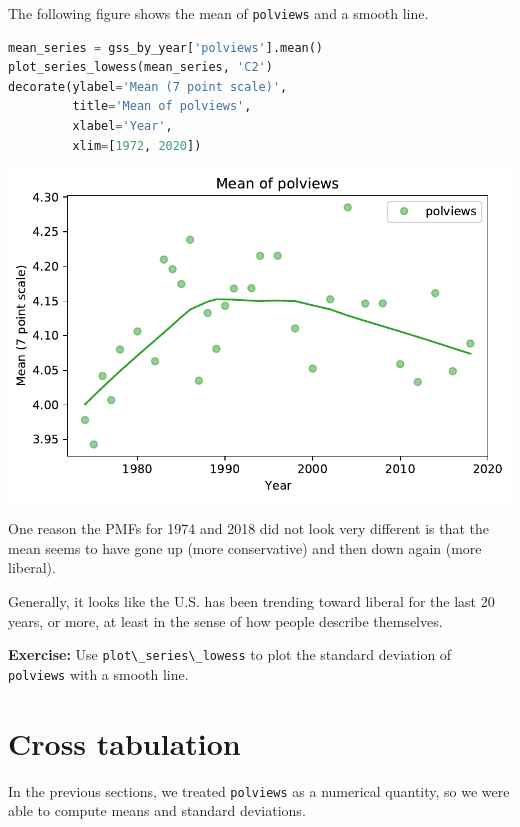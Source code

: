 The following figure shows the mean of
\passthrough{\lstinline!polviews!} and a smooth line.

\begin{lstlisting}[language=Python]
mean_series = gss_by_year['polviews'].mean()
plot_series_lowess(mean_series, 'C2')
decorate(ylabel='Mean (7 point scale)',
         title='Mean of polviews',
         xlabel='Year',
         xlim=[1972, 2020])
\end{lstlisting}

\begin{center}
\includegraphics[scale=0.75]{02_polviews_files/02_polviews_53_0.pdf}
\end{center}

One reason the PMFs for 1974 and 2018 did not look very different is
that the mean seems to have gone up (more conservative) and then down
again (more liberal).

Generally, it looks like the U.S. has been trending toward liberal for
the last 20 years, or more, at least in the sense of how people describe
themselves.

\textbf{Exercise:} Use \passthrough{\lstinline!plot\_series\_lowess!} to
plot the standard deviation of \passthrough{\lstinline!polviews!} with a
smooth line.

\hypertarget{cross-tabulation}{%
\section{Cross tabulation}\label{cross-tabulation}}

In the previous sections, we treated \passthrough{\lstinline!polviews!}
as a numerical quantity, so we were able to compute means and standard
deviations.

